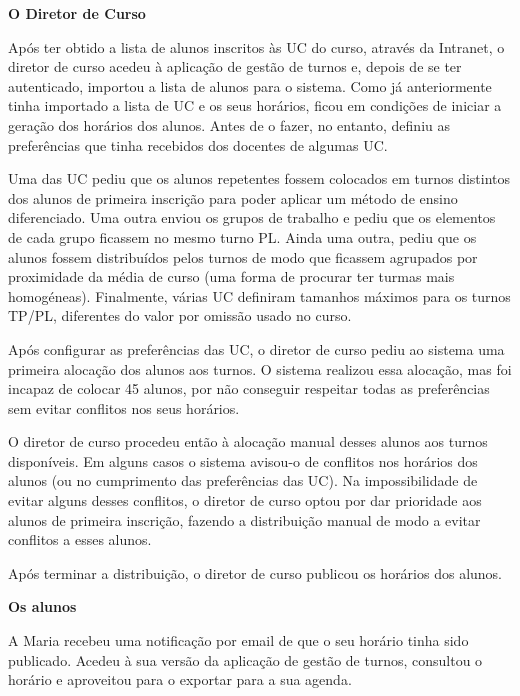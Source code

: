 \documentclass[12pt, a4paper]{article}
\begin{document}
\textbf{O Diretor de Curso}

Após ter obtido a lista de alunos inscritos às UC do curso, através da Intranet, o diretor de curso
acedeu à aplicação de gestão de turnos e, depois de se ter autenticado, importou a lista de alunos
para o sistema. Como já anteriormente tinha importado a lista de UC e os seus horários, ficou em
condições de iniciar a geração dos horários dos alunos. Antes de o fazer, no entanto, definiu as
preferências que tinha recebidos dos docentes de algumas UC.

Uma das UC pediu que os alunos repetentes fossem colocados em turnos distintos dos alunos de
primeira inscrição para poder aplicar um método de ensino diferenciado. Uma outra enviou os grupos
de trabalho e pediu que os elementos de cada grupo ficassem no mesmo turno PL. Ainda uma outra,
pediu que os alunos fossem distribuídos pelos turnos de modo que ficassem agrupados por proximidade
da média de curso (uma forma de procurar ter turmas mais homogéneas). Finalmente, várias UC
definiram tamanhos máximos para os turnos TP/PL, diferentes do valor por omissão usado no curso.

Após configurar as preferências das UC, o diretor de curso pediu ao sistema uma primeira alocação
dos alunos aos turnos. O sistema realizou essa alocação, mas foi incapaz de colocar 45 alunos, por
não conseguir respeitar todas as preferências sem evitar conflitos nos seus horários.

O diretor de curso procedeu então à alocação manual desses alunos aos turnos disponíveis. Em alguns
casos o sistema avisou-o de conflitos nos horários dos alunos (ou no cumprimento das preferências
das UC). Na impossibilidade de evitar alguns desses conflitos, o diretor de curso optou por dar
prioridade aos alunos de primeira inscrição, fazendo a distribuição manual de modo a evitar
conflitos a esses alunos.

Após terminar a distribuição, o diretor de curso publicou os horários dos alunos.

\textbf{Os alunos}

A Maria recebeu uma notificação por email de que o seu horário tinha sido publicado. Acedeu à sua
versão da aplicação de gestão de turnos, consultou o horário e aproveitou para o exportar para a
sua agenda.
\end{document}
